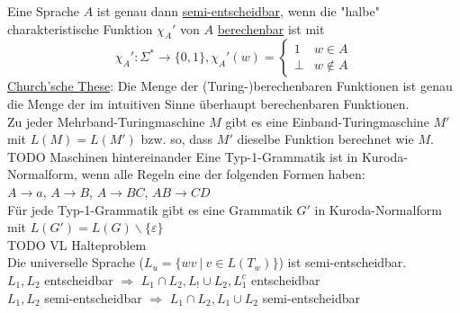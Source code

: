 \documentclass[a4paper]{article}
\newcommand{\ul}{\underline}
\let\epsilon\varepsilon
\begin{document}
Eine Sprache $A$ ist genau dann \ul{semi-entscheidbar}, wenn die "halbe" charakteristische Funktion $\chi_A'$ von $A$ \ul{berechenbar} ist mit $$\chi_A':\Sigma^*\rightarrow\{0,1\}, \chi_A'(w)=\begin{cases}
1 & w\in A\\
\bot & w\notin A
\end{cases}$$
\ul{Church'sche These}: Die Menge der (Turing-)berechenbaren Funktionen ist genau die Menge der im intuitiven Sinne überhaupt berechenbaren Funktionen.\\
Zu jeder Mehrband-Turingmaschine $M$ gibt es eine Einband-Turingmaschine $M'$ mit $L(M)=L(M')$ bzw. so, dass $M'$ dieselbe Funktion berechnet wie $M$.\\
TODO Maschinen hintereinander
Eine Typ-1-Grammatik ist in Kuroda-Normalform, wenn alle Regeln eine der folgenden Formen haben:\\
$A\rightarrow a$, $A\rightarrow B$, $A\rightarrow BC$, $AB\rightarrow CD$\\
Für jede Typ-1-Grammatik gibt es eine Grammatik $G'$ in Kuroda-Normalform mit $L(G')=L(G)\backslash\{\epsilon\}$\\
TODO VL Halteproblem\\
Die universelle Sprache ($L_u=\{wv\ \vert\ v\in L(T_w)\}$) ist semi-entscheidbar.\\
$L_1,L_2$ entscheidbar $\Rightarrow$ $L_1\cap L_2,L_!\cup L_2,L_1^c$ entscheidbar\\
$L_1,L_2$ semi-entscheidbar $\Rightarrow$ $L_1\cap L_2,L_1\cup L_2$ semi-entscheidbar\\
\end{document}
